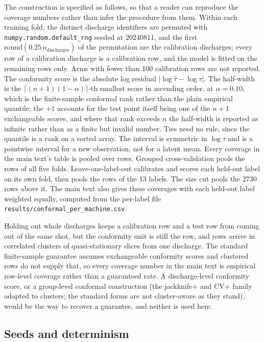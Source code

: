 \documentclass[12pt,letterpaper]{article}
\begin{document}
The construction is specified as follows, so that a reader can reproduce the
coverage numbers rather than infer the procedure from them. Within each training
fold, the distinct discharge identifiers are permuted with
\texttt{numpy.random.default\_rng} seeded at 20240811, and the first
$\mathrm{round}(0.25\,n_{\text{discharges}})$ of the permutation are the
calibration discharges; every row of a calibration discharge is a calibration
row, and the model is fitted on the remaining rows only. Arms with fewer than
100 calibration rows are not reported. The conformity score is the absolute log
residual $\lvert\log\hat\tau - \log\tau\rvert$. The half-width is the
$\lceil (n+1)(1-\alpha) \rceil$-th smallest score in ascending order, at
$\alpha=0.10$, which is the finite-sample conformal rank rather than the plain
empirical quantile; the $+1$ accounts for the test point itself being one of the
$n+1$ exchangeable scores, and where that rank exceeds $n$ the half-width is
reported as infinite rather than as a finite but invalid number. Ties need no
rule, since the quantile is a rank on a sorted array. The interval is
symmetric in $\log\tau$ and is a pointwise interval for a new observation, not
for a latent mean. Every coverage in the main text's table is pooled over
rows. Grouped cross-validation pools the rows of all five folds.
Leave-one-label-out calibrates and scores each held-out label on its own fold,
then pools the rows of the 13 labels. The size cut pools the 2730 rows above
it. The main text also gives these coverages with each held-out label weighted
equally, computed from the per-label file
\texttt{results/conformal\_per\_machine.csv}.

Holding out whole discharges keeps a calibration row and a test row from coming
out of the same shot, but the conformity unit is still the row, and rows arrive
in correlated clusters of quasi-stationary slices from one discharge. The
standard finite-sample guarantee assumes exchangeable conformity scores and
clustered rows do not supply that, so every coverage number in the main text is empirical
row-level coverage rather than a guaranteed rate. A discharge-level conformity
score, or a group-level conformal construction (the jackknife+ and CV+
family~\cite{jackknife} adapted to clusters; the standard forms are not
cluster-aware as they stand), would be the way to recover a guarantee, and
neither is used here.


\subsection{Seeds and determinism}
\end{document}
